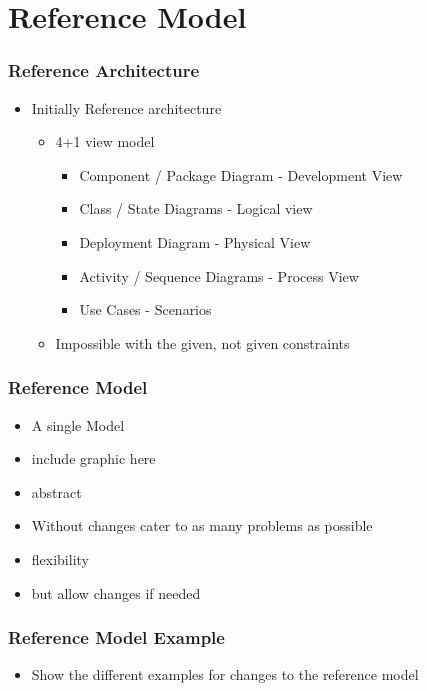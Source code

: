 \section{Reference Model}
\begin{frame}\frametitle{Reference Architecture}
	\begin{itemize}
		\item Initially Reference architecture
		\begin{itemize}
			\item 4+1 view model
			\begin{itemize}
				\item Component / Package Diagram - Development View
				\item Class / State Diagrams - Logical view
				\item Deployment Diagram - Physical View
				\item Activity / Sequence Diagrams - Process View
				\item Use Cases - Scenarios
			\end{itemize}
		\end{itemize}
		\begin{itemize}
			\item<2> Impossible with the given, not given constraints
		\end{itemize}
	\end{itemize}
\end{frame}
\begin{frame}\frametitle{Reference Model}
	\begin{itemize}
		\item A single Model
	\end{itemize}
	\begin{itemize}
		\item include graphic here
	\end{itemize}
	\begin{itemize}
		\item abstract
		\item Without changes cater to as many problems as possible
		\item flexibility
		\item but allow changes if needed
	\end{itemize}
\end{frame}
\begin{frame}\frametitle{Reference Model Example}
	\begin{itemize}
		\item Show the different examples for changes to the reference model
	\end{itemize}
\end{frame}